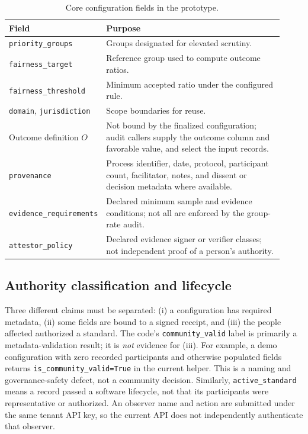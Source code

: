 \documentclass[10pt]{article}
\newcommand{\code}[1]{\texttt{#1}}
\begin{document}
\begin{table}[ht]
\centering
\caption{Core configuration fields in the prototype.}
\label{tab:config}
\begin{tabular}{p{0.25\linewidth}p{0.67\linewidth}}
\toprule
Field & Purpose \\
\midrule
\code{priority\_groups} & Groups designated for elevated scrutiny. \\
\code{fairness\_target} & Reference group used to compute outcome ratios. \\
\code{fairness\_threshold} & Minimum accepted ratio under the configured rule. \\
\code{domain}, \code{jurisdiction} & Scope boundaries for reuse. \\
Outcome definition $O$ & Not bound by the finalized configuration; audit callers
supply the outcome column and favorable value, and select the input records. \\
\code{provenance} & Process identifier, date, protocol, participant count,
facilitator, notes, and dissent or decision metadata where available. \\
\code{evidence\_requirements} & Declared minimum sample and evidence
conditions; not all are enforced by the group-rate audit. \\
\code{attestor\_policy} & Declared evidence signer or verifier classes; not
independent proof of a person's authority. \\
\bottomrule
\end{tabular}
\end{table}

\subsection{Authority classification and lifecycle}

Three different claims must be separated: (i) a configuration has required
metadata, (ii) some fields are bound to a signed receipt, and (iii) the people
affected authorized a standard. The code's \code{community\_valid} label is
primarily a metadata-validation result; it is \emph{not} evidence for (iii).
For example, a demo configuration with zero recorded participants and otherwise
populated fields returns \code{is\_community\_valid=True} in the current helper.
This is a naming and governance-safety defect, not a community decision.
Similarly, \code{active\_standard} means a record passed a software lifecycle,
not that its participants were representative or authorized. An observer name
and action are submitted under the same tenant API key, so the current API
does not independently authenticate that observer.
\end{document}
